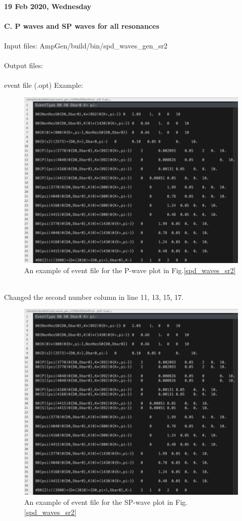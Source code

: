 \\
\clearpage
\noindent\textbf{19 Feb 2020, Wednesday}
\\
\\
\textbf{C. P waves and SP waves for all resonances}
\\
\\
\indent Input files: AmpGen/build/bin/spd\_waves\_gen\_sr2 
\\
\\
\indent Output files: 
\\
\\
event file (.opt) Example:
\begin{figure}[h]
\center
\includegraphics*[width=0.96\linewidth]{p_wave/event_info_p_sr2_10000}
\caption{An example of event file for the P-wave plot in Fig.\ref{spd_waves_sr2}}
\label{event_info_p_sr2_10000}
\end{figure}
\\
Changed the second number column in line 11, 13, 15, 17.
\begin{figure}[h]
\center
\includegraphics*[width=0.96\linewidth]{p_wave/event_info_sp_sr2_10000}
\caption{An example of event file for the SP-wave plot in Fig.\ref{spd_waves_sr2}}
\label{event_info_sp_sr2_10000}
\end{figure}
